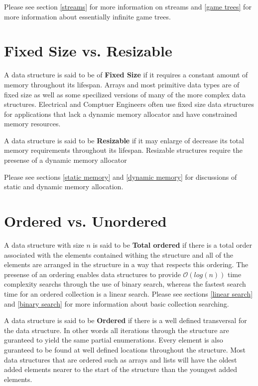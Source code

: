 \documentclass[12pt, letterpaper]{book}
\newcommand{\bigO}{\mathcal{O}}
\begin{document}
Please see section \ref{streams} for more information on streams and \ref{game trees} for more information about essentially infinite game trees.

\section{Fixed Size vs. Resizable}

A data structure is said to be of \textbf{Fixed Size} if it requires a constant amount of memory throughout its lifespan. Arrays and most primitive data types are of fixed size as well as some specilized versions of many of the more complex data structures. Electrical and Comptuer Engineers often use fixed size data structures for applications that lack a dynamic memory allocator and have constrained memory resources.

A data structure is said to be \textbf{Resizable} if it may enlarge of decrease its total memory requirements throughout its lifespan. Resizable structures require the presense of a dynamic memory allocator

Please see sections \ref{static memory} and \ref{dynamic memory} for discussions of static and dynamic memory allocation.

\section{Ordered vs. Unordered}

A data structure with size $n$ is said to be \textbf{Total ordered} if there is a total order associated with the elements contained withing the structure and all of the elements are arranged in the structure in a way that respects this ordering. The presense of an ordering enables data structures to provide $\bigO(log(n))$ time complexity searchs through the use of binary search, whereas the fastest search time for an ordered collection is a linear search. Please see sections \ref{linear search} and \ref{binary search} for more information about basic collection searching.

A data structure is said to be \textbf{Ordered} if there is a well defined transversal for the data structure. In other words all iterations through the structure are guranteed to yield the same partial enumerations. Every element is also guranteed to be found at well defined locations throughout the structure. Most data structures that are ordered such as arrays and lists will have the oldest added elements nearer to the start of the structure than the youngest added elements.
\end{document}
